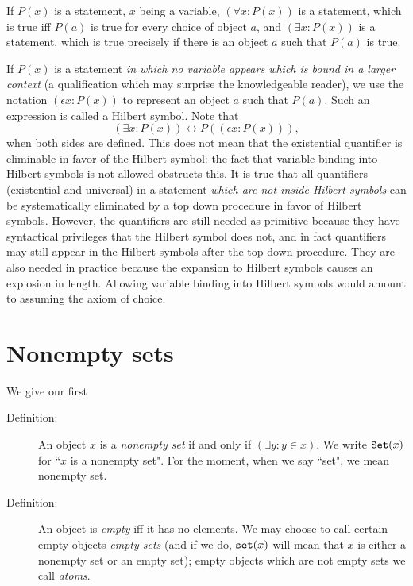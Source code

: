 \documentclass[12pt]{article}
\begin{document}
If $P(x)$ is a statement, $x$ being a variable, $(\forall x:P(x))$ is a statement, which is true iff $P(a)$ is true for every choice of object $a$,
and $(\exists x:P(x))$ is a statement, which is true precisely if there is an object $a$ such that $P(a)$ is true.

If $P(x)$ is a statement {\em in which no variable appears which is bound in a larger context\/} (a qualification which may surprise the knowledgeable reader), we use the notation $(\epsilon x:P(x))$ to represent an object $a$ such that $P(a)$.  Such an expression is called a Hilbert symbol.  Note that $$(\exists x:P(x)) \leftrightarrow P((\epsilon x:P(x))),$$  when both sides are defined.  This does not mean that the existential quantifier is eliminable in favor of the Hilbert symbol:  the fact that variable binding into Hilbert symbols is not allowed  obstructs this.  It is true that all quantifiers (existential and universal) in a statement {\em which are not inside Hilbert symbols\/} can be systematically eliminated by a top down procedure in favor of Hilbert symbols.  However, the quantifiers are still needed as primitive because they have syntactical privileges that the Hilbert symbol does not, and in fact quantifiers may still appear in the Hilbert symbols after the top down procedure. They are also needed in practice because the expansion to Hilbert symbols causes an explosion in length.  Allowing variable binding into Hilbert symbols would amount to assuming the axiom of choice.
\newpage

\section{Nonempty sets}

We give our first

\begin{description}

\item[Definition:]  An object $x$ is a {\em nonempty set\/} if and only if $(\exists y:y \in x)$.  We write ${\tt Set}(x)$ for ``$x$ is a nonempty set".  For the moment, when we say ``set",  we mean nonempty set.

\item[Definition:]  An object is {\em empty\/} iff it has no elements.  We may choose to call certain empty objects {\em empty sets\/} (and if we do, ${\tt set}(x)$ will mean that $x$ is either a nonempty set or an empty set);  empty objects which are not empty sets we call {\em atoms\/}.

\end{description}
\end{document}
